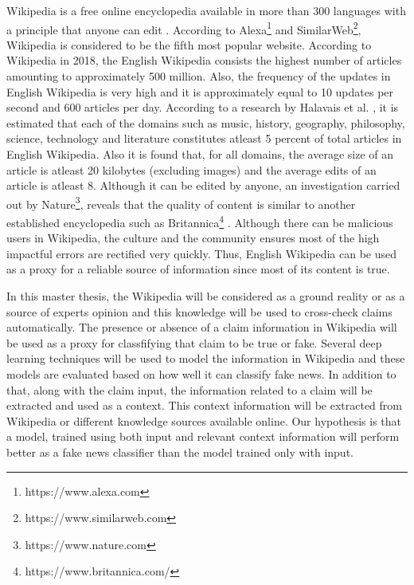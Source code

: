 \documentclass[a4paper, 11pt]{article}
\begin{document}
Wikipedia is a free online encyclopedia available in more than 300 languages with a principle that anyone can edit \cite{Wales2005}. According to Alexa\footnote{https://www.alexa.com} and SimilarWeb\footnote{https://www.similarweb.com}, Wikipedia is considered to be the fifth most popular website. According to Wikipedia in 2018, the English Wikipedia consists the highest number of articles amounting to approximately 500 million. Also, the frequency of the updates in English Wikipedia is very high and it is approximately equal to 10 updates per second and 600 articles per day. According to a research by Halavais et al. \cite{Halavais2008}, it is estimated that each of the domains such as music, history, geography, philosophy, science, technology and literature constitutes atleast 5 percent of total articles in English Wikipedia. Also it is found that, for all domains, the average size of an article is atleast 20 kilobytes (excluding images) and the average edits of an article is atleast 8. Although it can be edited by anyone, an investigation carried out by Nature\footnote{https://www.nature.com}, reveals that the quality of content is similar to another established encyclopedia such as Britannica\footnote{https://www.britannica.com/} \cite{Wales2005}. Although there can be malicious users in Wikipedia, the culture and the community ensures most of the high impactful errors are rectified very quickly\cite{Priedhorsky2007}. Thus, English Wikipedia can be used as a proxy for a reliable source of information since most of its content is true.
 
In this master thesis, the Wikipedia will be considered as a ground reality or as a source of experts opinion and this knowledge will be used to cross-check claims automatically. The presence or absence of a claim information in Wikipedia will be used as a proxy for classfifying that claim to be true or fake. Several deep learning techniques \cite{Goodfellow2016} will be used to model the information in Wikipedia and these models are evaluated based on how well it can classify fake news. In addition to that, along with the claim input, the information related to a claim will be extracted and used as a context. This context information will be extracted from Wikipedia or different knowledge sources available online.\color{red} Our hypothesis is that a model, trained using both input and relevant context information will perform better as a fake news classifier than the model trained only with input.\color{black}
\end{document}
